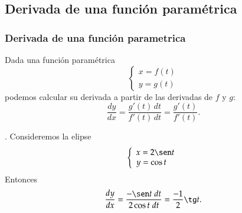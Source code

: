 \subsection{Derivada de una función paramétrica}
\begin{frame}
\frametitle{Derivada de una función parametrica}

Dada una función paramétrica
\[
\left\{%
\begin{array}{l}
x=f(t) \\
y=g(t) 
\end{array}%
\right.  
\]
podemos calcular su derivada a partir de las derivadas de $f$ y $g$:
\[\frac{dy}{dx}=\frac{g'(t)\,dt}{f'(t)\,dt}=\frac{g'(t)}{f'(t)}.\]

. Consideremos la elipse
\[
\left\{%
\begin{array}{l}
x=2\sen t \\
y=\cos t
\end{array}%
\right. 
\]
Entonces 
\[
\frac{dy}{dx}=\frac{-\sen t\; dt}{2 \cos t\; dt}=\frac{-1}{2}\tg t.
\]
\end{frame}
